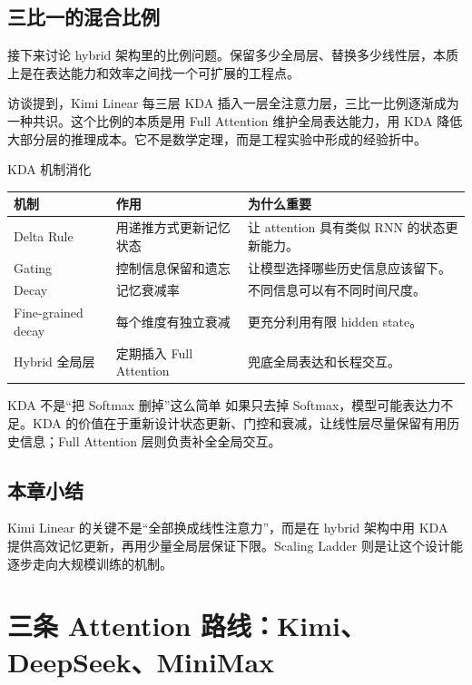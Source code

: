 \documentclass[a4paper]{article}
\begin{document}
\subsection{三比一的混合比例}

接下来讨论 hybrid 架构里的比例问题。保留多少全局层、替换多少线性层，本质上是在表达能力和效率之间找一个可扩展的工程点。

访谈提到，Kimi Linear 每三层 KDA 插入一层全注意力层，三比一比例逐渐成为一种共识。这个比例的本质是用 Full Attention 维护全局表达能力，用 KDA 降低大部分层的推理成本。它不是数学定理，而是工程实验中形成的经验折中。

\begin{knowledgebox}{KDA 机制消化}
\begin{tabularx}{\textwidth}{p{}p{}X}
\toprule
机制 & 作用 & 为什么重要 \\
\midrule
Delta Rule & 用递推方式更新记忆状态 & 让 attention 具有类似 RNN 的状态更新能力。 \\
Gating & 控制信息保留和遗忘 & 让模型选择哪些历史信息应该留下。 \\
Decay & 记忆衰减率 & 不同信息可以有不同时间尺度。 \\
Fine-grained decay & 每个维度有独立衰减 & 更充分利用有限 hidden state。 \\
Hybrid 全局层 & 定期插入 Full Attention & 兜底全局表达和长程交互。 \\
\bottomrule
\end{tabularx}
\end{knowledgebox}

\begin{warningbox}{KDA 不是“把 Softmax 删掉”这么简单}
如果只去掉 Softmax，模型可能表达力不足。KDA 的价值在于重新设计状态更新、门控和衰减，让线性层尽量保留有用历史信息；Full Attention 层则负责补全全局交互。
\end{warningbox}

\subsection{本章小结}

Kimi Linear 的关键不是“全部换成线性注意力”，而是在 hybrid 架构中用 KDA 提供高效记忆更新，再用少量全局层保证下限。Scaling Ladder 则是让这个设计能逐步走向大规模训练的机制。

\section{三条 Attention 路线：Kimi、DeepSeek、MiniMax}
\end{document}
